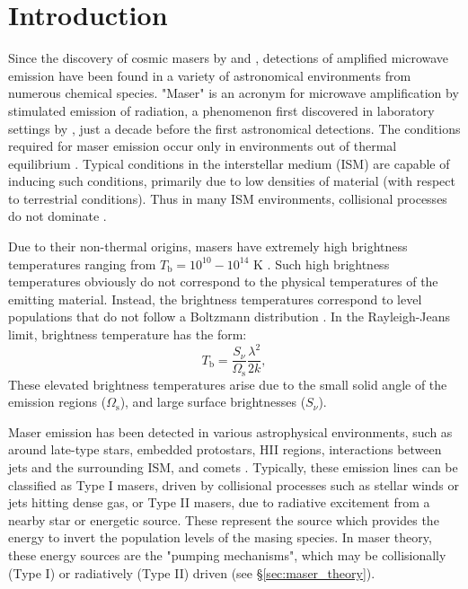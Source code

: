 \section{Introduction}
\label{sec:intro}

Since the discovery of cosmic masers by \citet{gundermann} and \citet{WEAVER_1965}, detections of amplified microwave emission have been found in a variety of astronomical environments from numerous chemical species. "Maser" is an acronym for microwave amplification by stimulated emission of radiation, a phenomenon first discovered in laboratory settings by \cite{Gordon_1955}, just a decade before the first astronomical detections. The conditions required for maser emission occur only in environments out of thermal equilibrium \citep[e.g.,]{Elitzur_1992}. Typical conditions in the interstellar medium (ISM) are capable of inducing such conditions, primarily due to low densities of material (with respect to terrestrial conditions). Thus in many ISM environments, collisional processes do not dominate \citep[e.g.,]{stahler_palla_2004}.

Due to their non-thermal origins, masers have extremely high brightness temperatures ranging from $T_{\mathrm{b}} = 10^{10}-10^{14}$ K \citep{lo2005}. Such high brightness temperatures obviously do not correspond to the physical temperatures of the emitting material. Instead, the brightness temperatures correspond to level populations that do not follow a Boltzmann distribution \citep{Elitzur_1992}. In the Rayleigh-Jeans limit, brightness temperature has the form: 
\begin{equation}
\label{eq:temp_bright}
T_{\mathrm{b}} = \frac{S_\nu}{\Omega_{\mathrm{s}}} \frac{\lambda^2}{2k},
\end{equation}
These elevated brightness temperatures arise due to the small solid angle of the emission regions ($\Omega_{\mathrm{s}}$), and large surface brightnesses ($S_\nu$).

Maser emission has been detected in various astrophysical environments, such as around late-type stars, embedded protostars, HII regions, interactions between jets and the surrounding ISM, and comets \citep{lo2005}. Typically, these emission lines can be classified as Type I masers, driven by collisional processes such as stellar winds or jets hitting dense gas, or Type II masers, due to radiative excitement from a nearby star or energetic source. These represent the source which provides the energy to invert the population levels of the masing species. In maser theory, these energy sources are the "pumping mechanisms", which may be collisionally (Type I) or radiatively (Type II) driven (see \S\ref{sec:maser_theory}).

